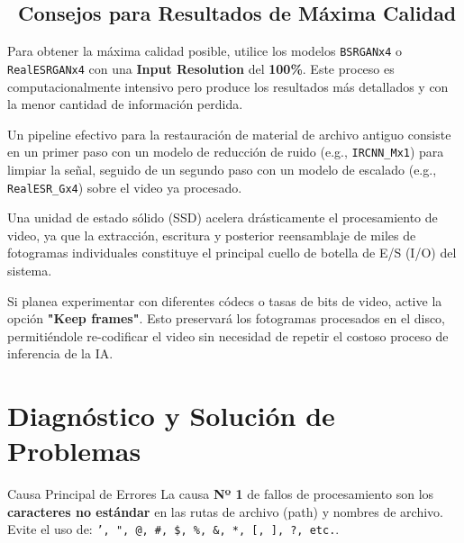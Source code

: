 \documentclass[11pt, a4paper]{article}
\newcommand{\SectionColor}{WarlockGray} %
\newcommand{\setsectioncolor}[1]{\renewcommand{\SectionColor}{#1}}
\begin{document}
\subsection{\faTrophy\ Consejos para Resultados de Máxima Calidad}
\begin{description}[leftmargin=*, style=nextline, itemsep=0.8em]
    \item[Maximización de la Fidelidad Visual] Para obtener la máxima calidad posible, utilice los modelos \texttt{BSRGANx4} o \texttt{RealESRGANx4} con una \textbf{Input Resolution} del \textbf{100\%}. Este proceso es computacionalmente intensivo pero produce los resultados más detallados y con la menor cantidad de información perdida.
    \item[Flujo de Trabajo para Restauración de Video] Un pipeline efectivo para la restauración de material de archivo antiguo consiste en un primer paso con un modelo de reducción de ruido (e.g., \texttt{IRCNN_Mx1}) para limpiar la señal, seguido de un segundo paso con un modelo de escalado (e.g., \texttt{RealESR_Gx4}) sobre el video ya procesado.
    \item[Impacto del Almacenamiento SSD] Una unidad de estado sólido (SSD) acelera drásticamente el procesamiento de video, ya que la extracción, escritura y posterior reensamblaje de miles de fotogramas individuales constituye el principal cuello de botella de E/S (I/O) del sistema.
    \item[Persistencia de Fotogramas para Experimentación] Si planea experimentar con diferentes códecs o tasas de bits de video, active la opción \textbf{"Keep frames"}. Esto preservará los fotogramas procesados en el disco, permitiéndole re-codificar el video sin necesidad de repetir el costoso proceso de inferencia de la IA.
\end{description}

\setsectioncolor{TroubleColor}
\section{Diagnóstico y Solución de Problemas}
\begin{warnbox}{Causa Principal de Errores}
La causa \textbf{Nº 1} de fallos de procesamiento son los \textbf{caracteres no estándar} en las rutas de archivo (path) y nombres de archivo. Evite el uso de: \texttt{', ", @, \#, \$, \%, \&, *, [, ], ?, etc.}.
\end{warnbox}
\end{document}
